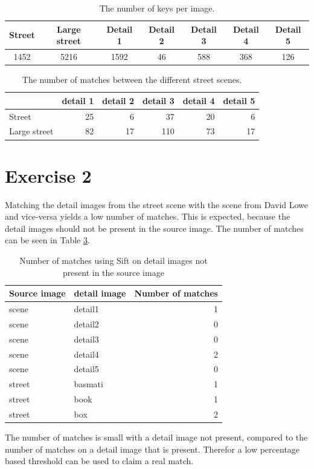 \documentclass[11pt,a4paper]{article}
\begin{document}
\begin{table}
    \centering
    \begin{tabular}{c|c|c|c|c|c|c}
        Street & Large street & Detail 1 & Detail 2 & Detail 3 & Detail 4 & Detail 5 \\
        \hline
        1452 & 5216 & 1592 & 46 & 588 & 368 & 126 \\
    \end{tabular}
    \caption{The number of keys per image.}
    \label{tab:streetkeys}
\end{table}

\begin{table}
    \centering
    \begin{tabular}{l|r|r|r|r|r|}
        & detail 1 & detail 2 & detail 3 & detail 4 & detail 5 \\
        \hline
        Street & 25 & 6 & 37 & 20 & 6 \\
        \hline
        Large street & 82 & 17 & 110 & 73 & 17 \\
        \hline
    \end{tabular}
    \caption{The number of matches between the different street scenes.}
    \label{tab:streetdetails}
\end{table}

\section*{Exercise 2}
Matching the detail images from the street scene with the scene from David Lowe and vice-versa yields a low number of matches.
This is expected, because the detail images should not be present in the source image. The number of matches can be seen in Table \ref{tab:mismatches}.
\begin{table}[H]
	\centering
	\begin{tabular}{l|l|r}
		Source image & detail image & Number of matches\\
		\hline
		scene & detail1 & 1\\
		scene & detail2 & 0\\
		scene & detail3 & 0\\
		scene & detail4 & 2\\
		scene & detail5 & 0\\
		street & basmati & 1\\
		street & book & 1\\
		street & box & 2
	\end{tabular}
	\caption{Number of matches using Sift on detail images not present in the source image}
	\label{tab:mismatches}
\end{table}
\noindent The number of matches is small with a detail image not present, compared to the number of matches on a detail image that is present. Therefor a low percentage based threshold can be used to claim a real match. 
\end{document}
